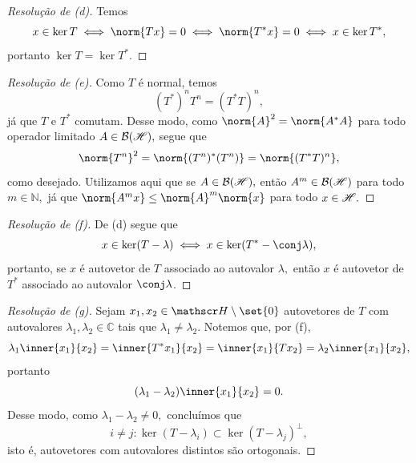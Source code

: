 \begin{proof}[Resolução de (d)]
  Temos
  \begin{equation*}
    x \in \ker T \iff \norm{Tx} = 0 \iff \norm{T^*x} = 0 \iff x \in \ker{T^*},
  \end{equation*}
  portanto \(\ker{T} = \ker{T^*}.\)
\end{proof}
\begin{proof}[Resolução de (e)]
  Como \(T\) é normal, temos
  \begin{equation*}
    (T^*)^n T^n = (T^*T)^n,
  \end{equation*}
  já que \(T\) e \(T^*\) comutam. Desse modo, como \(\norm{A}^2 = \norm{A^*A}\) para todo operador limitado \(A \in \mathcal{B}(\mathscr{H}),\) segue que
  \begin{equation*}
    \norm{T^n}^2 = \norm{(T^n)^*(T^n)} = \norm{(T^*T)^n},
  \end{equation*}
  como desejado. Utilizamos aqui que se \(A \in \mathcal{B}(\mathscr{H}),\) então \(A^m \in \mathcal{B}(\mathscr{H})\) para todo \(m \in \mathbb{N},\) já que \(\norm{A^mx} \leq \norm{A}^m \norm{x}\) para todo \(x \in \mathscr{H}.\)
\end{proof}
\begin{proof}[Resolução de (f)]
  De (d) segue que
  \begin{equation*}
    x \in \ker(T - \lambda) \iff x \in \ker(T^* - \conj\lambda),
  \end{equation*}
  portanto, se \(x\) é autovetor de \(T\) associado ao autovalor \(\lambda,\) então \(x\) é autovetor de \(T^*\) associado ao autovalor \(\conj\lambda\).
\end{proof}
\begin{proof}[Resolução de (g)]
  Sejam \(x_1, x_2 \in \hilbert\setminus\set{0}\) autovetores de \(T\) com autovalores \(\lambda_1, \lambda_2 \in \mathbb{C}\) tais que \(\lambda_1 \neq \lambda_2.\) Notemos que, por (f),
  \begin{equation*}
    \lambda_1 \inner{x_1}{x_2} = \inner{T^*x_1}{x_2} = \inner{x_1}{Tx_2} = \lambda_2 \inner{x_1}{x_2},
  \end{equation*}
  portanto
  \begin{equation*}
    (\lambda_1 - \lambda_2) \inner{x_1}{x_2} = 0.
  \end{equation*}
  Desse modo, como \(\lambda_1 - \lambda_2 \neq 0,\) concluímos que
  \begin{equation*}
      i \neq j: \ker(T - \lambda_i) \subset \ker(T - \lambda_j)^\perp,
  \end{equation*}
  isto é, autovetores com autovalores distintos são ortogonais.
\end{proof}
